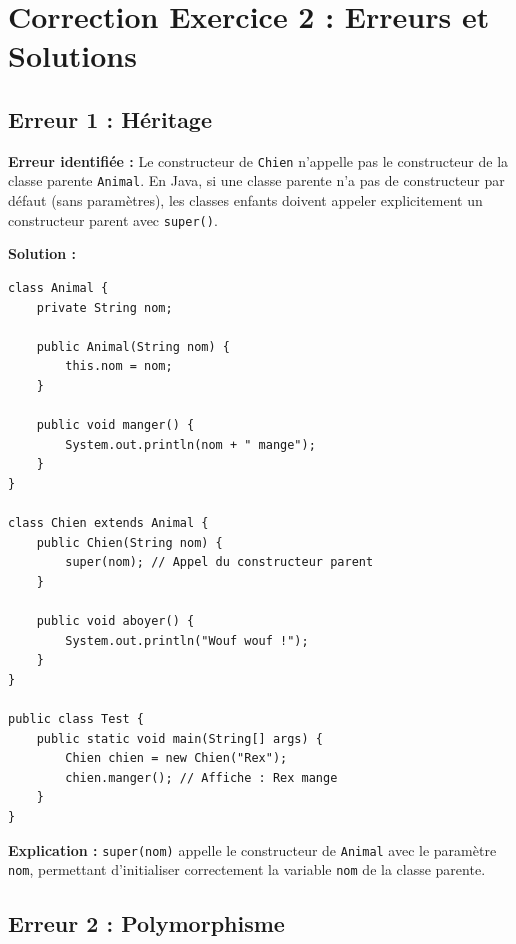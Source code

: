 \documentclass[11pt,a4paper]{article}
\begin{document}
\newpage

\section{Correction Exercice 2 : Erreurs et Solutions}

\subsection{Erreur 1 : Héritage}

\begin{correctionbox}
\textbf{Erreur identifiée :} Le constructeur de \texttt{Chien} n'appelle pas le constructeur de la classe parente \texttt{Animal}. En Java, si une classe parente n'a pas de constructeur par défaut (sans paramètres), les classes enfants doivent appeler explicitement un constructeur parent avec \texttt{super()}.

\textbf{Solution :}

\begin{lstlisting}
class Animal {
    private String nom;
    
    public Animal(String nom) {
        this.nom = nom;
    }
    
    public void manger() {
        System.out.println(nom + " mange");
    }
}

class Chien extends Animal {
    public Chien(String nom) {
        super(nom); // Appel du constructeur parent
    }
    
    public void aboyer() {
        System.out.println("Wouf wouf !");
    }
}

public class Test {
    public static void main(String[] args) {
        Chien chien = new Chien("Rex");
        chien.manger(); // Affiche : Rex mange
    }
}
\end{lstlisting}

\textbf{Explication :} \texttt{super(nom)} appelle le constructeur de \texttt{Animal} avec le paramètre \texttt{nom}, permettant d'initialiser correctement la variable \texttt{nom} de la classe parente.
\end{correctionbox}

\subsection{Erreur 2 : Polymorphisme}
\end{document}
